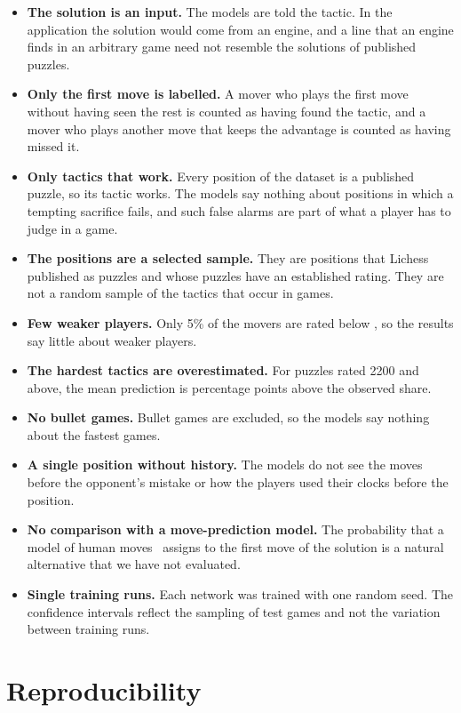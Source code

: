 \documentclass[11pt]{article}
\begin{document}
\begin{itemize}
\item \textbf{The solution is an input.} The models are told the tactic. In
the application the solution would come from an engine, and a line that an
engine finds in an arbitrary game need not resemble the solutions of
published puzzles.
\item \textbf{Only the first move is labelled.} A mover who plays the first
move without having seen the rest is counted as having found the tactic, and
a mover who plays another move that keeps the advantage is counted as having
missed it.
\item \textbf{Only tactics that work.} Every position of the dataset is a
published puzzle, so its tactic works. The models say nothing about positions in which a tempting
sacrifice fails, and such false alarms are part of what a player has to
judge in a game.
\item \textbf{The positions are a selected sample.} They are positions that
Lichess published as puzzles and whose puzzles have an established rating.
They are not a random sample of the tactics that occur in games.
\iflook
\item \textbf{Few weaker players.} Only 5\% of the movers are rated below
, so the results say little about weaker players.
\item \textbf{The hardest tactics are overestimated.} For puzzles rated 2200
and above, the mean prediction is
 percentage points above the
observed share.
\fi
\item \textbf{No bullet games.} Bullet games are excluded, so the models say
nothing about the fastest games.
\item \textbf{A single position without history.} The models do not see the
moves before the opponent's mistake or how the players used their clocks
before the position.
\item \textbf{No comparison with a move-prediction model.} The probability
that a model of human moves~\cite{maia2} assigns to the first move of the
solution is a natural alternative that we have not evaluated.
\item \textbf{Single training runs.} Each network was trained with one
random seed. The confidence intervals reflect the sampling of test games and
not the variation between training runs.
\end{itemize}

\section{Reproducibility}
\label{sec:cost}
\end{document}
